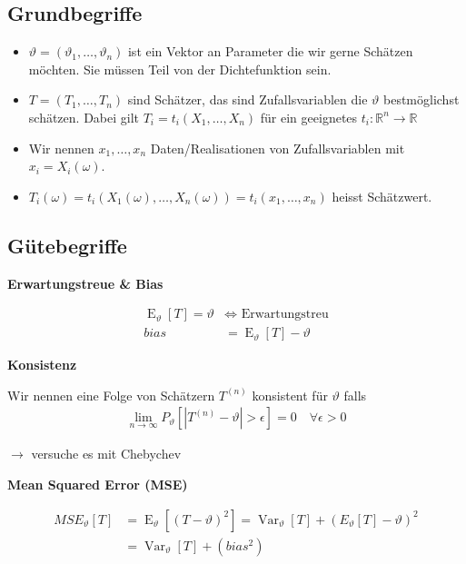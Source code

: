 \documentclass[25pt]{sciposter}
\newcommand{\R}{\mathbb{R}}
\newcommand{\Var}{\operatorname{Var}}
\newcommand{\E}{\operatorname{E}}
\newenvironment{method}[1]{\begin{mdframed}[backgroundcolor=blue!10,innertopmargin=15pt, innerbottommargin=15pt,nobreak=true]
		\textbf{#1 }
	}
	{ 
	\end{mdframed}
}
\begin{document}
\begin{multicols}{3}
\subsection*{Grundbegriffe}

\begin{itemize}
	\item $\vartheta =  (\vartheta_1,\ldots,\vartheta_n)$ ist ein Vektor an Parameter die wir gerne Schätzen möchten. Sie müssen Teil von der Dichtefunktion sein.
	\item $T = (T_1,\ldots,T_n)$ sind Schätzer, das sind Zufallsvariablen die $\vartheta$ bestmöglichst schätzen. Dabei gilt $T_i = t_i(X_1,\ldots,X_n)$ für ein geeignetes $t_i:\R^n \to \R$
	\item Wir nennen $x_1,\ldots,x_n$ Daten/Realisationen von Zufallsvariablen mit $x_i = X_i(\omega)$.
	\item $T_i(\omega) = t_i(X_1(\omega), \ldots, X_n(\omega)) = t_i(x_1,\ldots,x_n) $ heisst Schätzwert.
\end{itemize}

\subsection*{Gütebegriffe}

\begin{method}{Erwartungstreue \& Bias}
	\begin{align*}
	\E_\vartheta[T] = \vartheta &\iff \text{ Erwartungstreu}\\
	bias &= \E_\vartheta[T] - \vartheta
	\end{align*}
\end{method}

\begin{method}{Konsistenz}
	Wir nennen eine Folge von Schätzern $T^{(n)}$ konsistent für $\vartheta$ falls
	\begin{align*}
\lim_{n\to\infty} P_\vartheta [|T^{(n)} - \vartheta| > \epsilon] = 0 \quad \forall \epsilon > 0
	\end{align*}
	
	{\Large $\rightarrow$ versuche es mit Chebychev}
\end{method}




\begin{method}{Mean Squared Error (MSE)}
\begin{align*}
	MSE_\vartheta[T] &= \E_\vartheta [(T-\vartheta)^2]= \Var_\vartheta[T] + (E_\vartheta [T]-\vartheta)^2\\
	&=  \Var_\vartheta[T] + (bias^2)
\end{align*}
\end{method}





\end{multicols}
\end{document}
